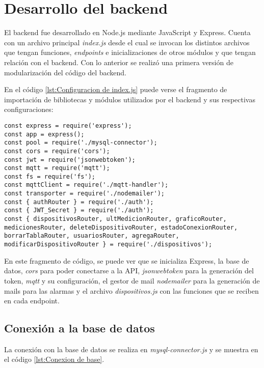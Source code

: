 \section{Desarrollo del backend}

El backend fue desarrollado en Node.js mediante JavaScript y Express. Cuenta con un archivo principal \textit{index.js} desde el cual se invocan los distintos archivos que tengan funciones, \textit{endpoints} e inicializaciones de otros módulos y que tengan relación con el backend. Con lo anterior se realizó una primera versión de modularización del código del backend.

En el código \ref{lst:Configuracion de index.js} puede verse el fragmento de importación de bibliotecas y módulos utilizados por el backend y sus respectivas configuraciones:

\newpage
\begin{lstlisting}[caption={Configuración de \textit{index.js}.}, label={lst:Configuracion de index.js}]
const express = require('express');
const app = express();
const pool = require('./mysql-connector');
const cors = require('cors');
const jwt = require('jsonwebtoken');
const mqtt = require('mqtt');
const fs = require('fs');
const mqttClient = require('./mqtt-handler');
const transporter = require('./nodemailer');
const { authRouter } = require('./auth');
const { JWT_Secret } = require('./auth');
const { dispositivosRouter, ultMedicionRouter, graficoRouter, medicionesRouter, deleteDispositivoRouter, estadoConexionRouter, borrarTablaRouter, usuariosRouter, agregaRouter, modificarDispositivoRouter } = require('./dispositivos');
\end{lstlisting}

En este fragmento de código, se puede ver que se inicializa Express, la base de datos, \textit{cors} para poder conectarse a la API, \textit{jsonwebtoken} para la generación del token, \textit{mqtt} y su configuración, el gestor de mail \textit{nodemailer} para la generación de mails para las alarmas y el archivo \textit{dispositivos.js} con las funciones que se reciben en cada endpoint.

\subsection{Conexión a la base de datos}

La conexión con la base de datos se realiza en \textit{mysql-connector.js} y se muestra en el código \ref{lst:Conexion de base}.

